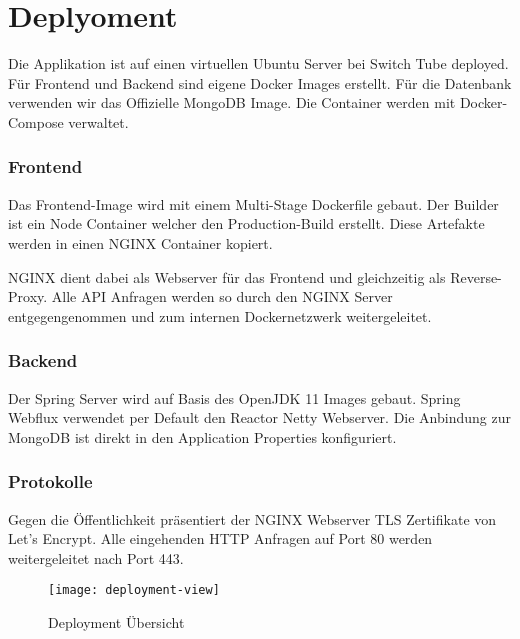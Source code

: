 \section{Deplyoment}

Die Applikation ist auf einen virtuellen Ubuntu Server bei Switch Tube deployed.
Für Frontend und Backend sind eigene Docker Images erstellt.
Für die Datenbank verwenden wir das Offizielle MongoDB Image.
Die Container werden mit Docker-Compose verwaltet.

\subsubsection*{Frontend}
Das Frontend-Image wird mit einem Multi-Stage Dockerfile gebaut.
Der Builder ist ein Node Container welcher den Production-Build erstellt.
Diese Artefakte werden in einen NGINX Container kopiert.

NGINX dient dabei als Webserver für das Frontend und gleichzeitig als Reverse-Proxy.
Alle API Anfragen werden so durch den NGINX Server entgegengenommen und zum internen Dockernetzwerk weitergeleitet.

\subsubsection*{Backend}
Der Spring Server wird auf Basis des OpenJDK 11 Images gebaut.
Spring Webflux verwendet per Default den Reactor Netty Webserver.
Die Anbindung zur MongoDB ist direkt in den Application Properties konfiguriert.


\subsubsection*{Protokolle}
Gegen die Öffentlichkeit präsentiert der NGINX Webserver TLS Zertifikate von Let's Encrypt.
Alle eingehenden HTTP Anfragen auf Port 80 werden weitergeleitet nach Port 443.


\begin{figure}[H]
    \texttt{[image: deployment-view]}
    \caption{Deployment Übersicht}
    \label{fig:Deplyoment}
\end{figure}
